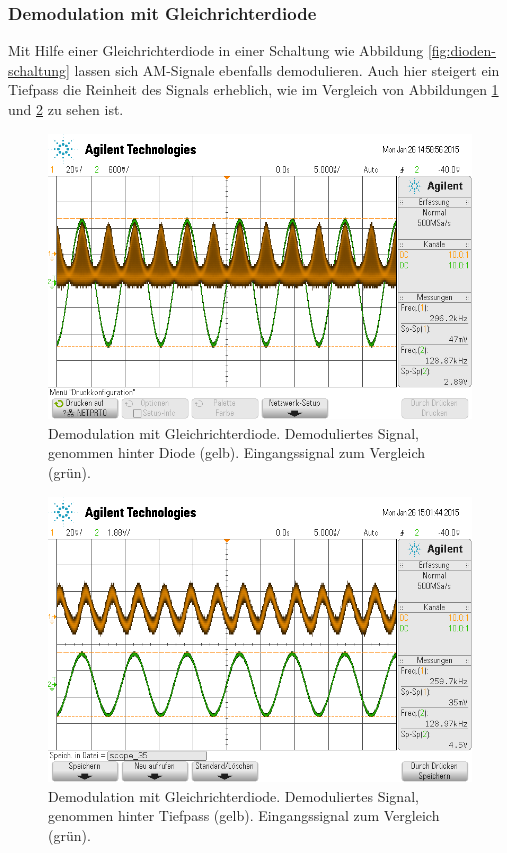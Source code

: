 \subsubsection{Demodulation mit Gleichrichterdiode}
\label{subsubsec:gleichrichterdiode}
Mit Hilfe einer Gleichrichterdiode in einer Schaltung wie Abbildung
\ref{fig:dioden-schaltung} lassen sich AM-Signale ebenfalls demodulieren.
Auch hier steigert ein Tiefpass die Reinheit des Signals erheblich, wie
im Vergleich von Abbildungen \ref{fig:am-diode} und \ref{fig:am-diode-tp}
zu sehen ist.
\begin{figure}
    \centering
    \includegraphics[width=0.8\linewidth]{images/am-diode.png}
    \caption{
        Demodulation mit Gleichrichterdiode.
        Demoduliertes Signal, genommen hinter Diode (gelb).
        Eingangssignal zum Vergleich (grün).
    }
    \label{fig:am-diode}
\end{figure}
\begin{figure}
    \centering
    \includegraphics[width=0.8\linewidth]{images/am-diode-tp.png}
    \caption{
        Demodulation mit Gleichrichterdiode.
        Demoduliertes Signal, genommen hinter Tiefpass (gelb).
        Eingangssignal zum Vergleich (grün).
    }
    \label{fig:am-diode-tp}
\end{figure}

